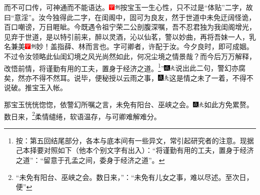而不可口传，可神通而不能语达。{\includegraphics[width=3mm]{../Images/00002}\includegraphics[width=3mm]{../Images/00011}\footnotesize \kaishu 按宝玉一生心性，只不过是“体贴”二字，故曰“意淫”。}汝今独得此二字，在闺阁中，固可为良友，然于世道中未免迂阔怪诡，百口嘲谤，万目睚眦。今既遇令祖宁荣二公剖腹深嘱，吾不忍君独为我闺阁增光，见弃于世道，是以特引前来，醉以灵酒，沁以仙茗，警以妙曲，再将吾妹一人，乳名兼美{\includegraphics[width=3mm]{../Images/00002}\includegraphics[width=3mm]{../Images/00011}\footnotesize \kaishu 妙！盖指薛、林而言也。}字可卿者，许配于汝。今夕良时，即可成姻。不过令汝领略此仙闺幻境之风光尚然如此，何况尘境之情景哉？而今后万万解释，改悟前情，将谨勤有用的工夫，置身于经济之道。\footnote{按：第五回结尾部分，各本与底本间有一些异文，常引起研究者的注意。现据己本择要对照如下（他本个别文字有出入）：“将谨勤有用的工夫，置身于经济之道”：“留意于孔孟之间，委身于经济之道”。}”{\includegraphics[width=3mm]{../Images/00005}\includegraphics[width=3mm]{../Images/00012}\footnotesize \kaishu 说出此二句，警幻亦腐矣，然亦不得不然耳。}说毕，便秘授以云雨之事，{\includegraphics[width=3mm]{../Images/00005}\includegraphics[width=3mm]{../Images/00012}\footnotesize \kaishu 这是情之未了一着，不得不说破。}推宝玉入帐。

那宝玉恍恍惚惚，依警幻所嘱之言，未免有阳台、巫峡之会。{\includegraphics[width=3mm]{../Images/00005}\includegraphics[width=3mm]{../Images/00012}\footnotesize \kaishu 如此方免累赘。}数日来，\footnote{“未免有阳台、巫峡之会。数日来，”：“未免有儿女之事，难以尽述。至次日，便”}柔情缱绻，软语温存，与可卿难解难分。


